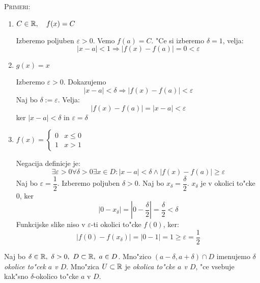 \textsc{Primeri:}
\begin{enumerate}[1)]
	\item $C \in \mathbb{R}, \quad f(x) = C$ 
	
	Izberemo poljuben $\varepsilon > 0$. Vemo $f(a) = C$. "Ce si izberemo $\delta = 1$, velja:
	\begin{equation*}
	|x - a| < 1 \Rightarrow |f(x) - f(a)| = 0 < \varepsilon
	\end{equation*}
	
	\item $g(x) = x$ 
	
	Izberemo $\varepsilon > 0$. Dokazujemo
	\begin{equation*}
		|x - a| < \delta \Rightarrow |f(x) - f(a)| < \varepsilon
	\end{equation*}
	Naj bo $\delta := \varepsilon$. Velja:
	\begin{equation*}
	|f(x)-f(a)| = |x-a| < \varepsilon
	\end{equation*}
	ker $|x-a| < \delta$ in $\varepsilon = \delta$
	
	\item $f(x) = \begin{cases} 0 & x \leq 0 \\ 1 & x > 1\end{cases}$ 
	
	Negacija definicje je:
	\begin{equation*}
	\exists \varepsilon >0 \forall \delta>0 \exists x \in D: |x-a| < \delta \land |f(x) - f(a)| \geq \varepsilon
	\end{equation*}
	Naj bo $\varepsilon = \dfrac{1}{2}$. Izberemo poljuben $\delta > 0$. Naj bo $x_\delta = \dfrac{\delta}{2}$. $x_\delta$ je v okolici to"cke 0, ker
	\begin{equation*}
	|0 - x_\delta| = |0 - \dfrac{\delta}{2}| = \dfrac{\delta}{2} < \delta
	\end{equation*}
	Funkcijske slike niso v $\varepsilon$-ti okolici to"cke $f(0)$, ker:
	\begin{equation*}
	|f(0) - f(x_\delta)| = |0 - 1| = 1 \geq \varepsilon = \dfrac{1}{2}
	\end{equation*}
\end{enumerate}
 Naj bo $\delta \in \mathbb{R},\ \delta > 0,\ D \subset \mathbb{R},\ a \in D$. Mno"zico $(a - \delta, a + \delta) \cap D$ imenujemo \emph{$\delta$ okolice to"cek $a$ v $D$}. Mno"zica $U \subset \mathbb{R}$ je \emph{okolica to"cke $a$ v $D$}, "ce vsebuje kak"sno $\delta$-okolico to"cke $a$ v $D$.


